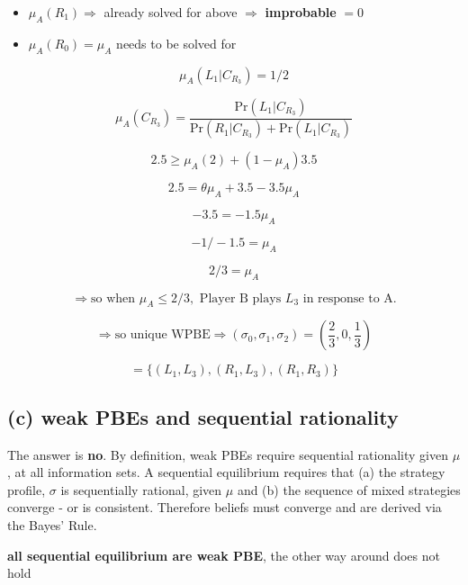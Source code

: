 \documentclass{article}
\begin{document}
\begin{itemize}
    \item $\mu_A(R_1) \Rightarrow$ already solved for above $\Rightarrow$ \textbf{improbable} $= 0$
    \item $\mu_A(R_0) = \mu_A$ needs to be solved for
\end{itemize}

\[
\mu_A(L_1 | C_{R_3}) = 1/2
\]

\[
\mu_A(C_{R_3}) = \frac{\text{Pr}(L_1 | C_{R_3})}{\text{Pr}(R_1 | C_{R_3}) + \text{Pr}(L_1 | C_{R_3})}
\]

\[
2.5 \geq \mu_A(2) + (1 - \mu_A)3.5
\]

\[
2.5 = \theta \mu_A + 3.5 - 3.5\mu_A
\]

\[
-3.5 = -1.5\mu_A
\]

\[
-1 / -1.5 = \mu_A
\]

\[
2/3 = \mu_A
\]

\[
\Rightarrow \text{so when } \mu_A \leq 2/3, \text{ Player B plays } L_3 \text{ in response to A.}
\]

\[
\Rightarrow \text{so unique WPBE} \Rightarrow (\sigma_0, \sigma_1, \sigma_2) = \left( \frac{2}{3}, 0, \frac{1}{3} \right)
\]

\[
= \{(L_1, L_3), (R_1, L_3), (R_1, R_3)\}
\]

\subsection*{(c) weak PBEs and sequential rationality}

The answer is \textbf{no}. By definition, weak PBEs require sequential rationality given $\mu$, at all information sets. A sequential equilibrium requires that (a) the strategy profile, $\sigma$ is sequentially rational, given $\mu$ and (b) the sequence of mixed strategies converge - or is consistent. Therefore beliefs must converge and are derived via the Bayes' Rule.  
\vspace{2mm}
\begin{center}
    \textbf{all sequential equilibrium are weak PBE}, the other way around does not hold
\end{center}
\end{document}
